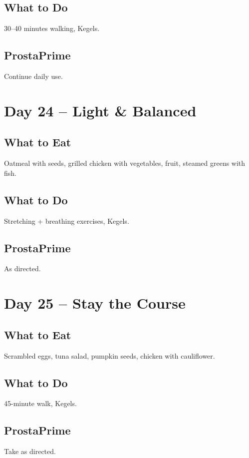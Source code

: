 \documentclass[11pt,oneside]{book}
\begin{document}
\section*{What to Do}
30--40 minutes walking, Kegels.

\section*{ProstaPrime}
Continue daily use.

\clearpage


\chapter*{Day 24 – Light & Balanced}

\section*{What to Eat}
Oatmeal with seeds, grilled chicken with vegetables, fruit, steamed greens with fish.

\section*{What to Do}
Stretching + breathing exercises, Kegels.

\section*{ProstaPrime}
As directed.

\clearpage


\chapter*{Day 25 – Stay the Course}

\section*{What to Eat}
Scrambled eggs, tuna salad, pumpkin seeds, chicken with cauliflower.

\section*{What to Do}
45-minute walk, Kegels.

\section*{ProstaPrime}
Take as directed.
\end{document}
